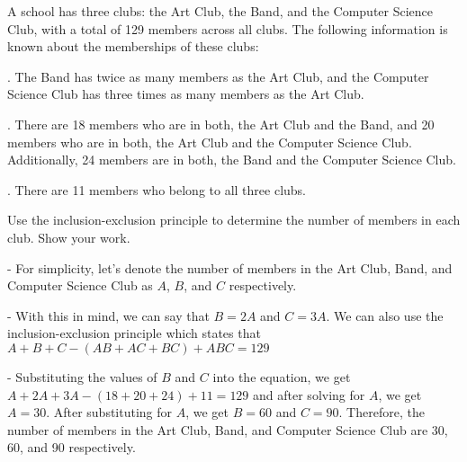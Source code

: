 \documentclass{article}
\begin{document}

\vspace{0.1in}
\begin{problem}
A school has three clubs: the Art Club, the Band, and the Computer Science Club, with a total of 129 members across all clubs. The following information is known about the memberships of these clubs:

. The Band has twice as many members as the Art Club, and the Computer Science Club has three times as many members as the Art Club.

. There are 18 members who are in both, the Art Club and the Band, and 20 members who are in both, the Art Club and the Computer Science Club. Additionally, 24 members are in both, the Band and the Computer Science Club.

. There are 11 members who belong to all three clubs.

\noindent Use the inclusion-exclusion principle to determine the number of members in each club. Show your work.

\vspace{0.1in} - For simplicity, let's denote the number of members in the Art Club, Band, and Computer Science Club as $A$, $B$, and $C$ respectively.

\vspace{0.1in} - With this in mind, we can say that $B=2A$ and $C=3A$. We can also use the inclusion-exclusion principle which states that $A+B+C-(AB+AC+BC)+ABC=129$

\vspace{0.1in} - Substituting the values of $B$ and $C$ into the equation, we get $A+2A+3A-(18+20+24)+11=129$ and after solving for $A$, we get $A=30$. After substituting for $A$, we get $B=60$ and $C=90$. Therefore, the number of members in the Art Club, Band, and Computer Science Club are 30, 60, and 90 respectively.

\end{problem}


\end{document}
